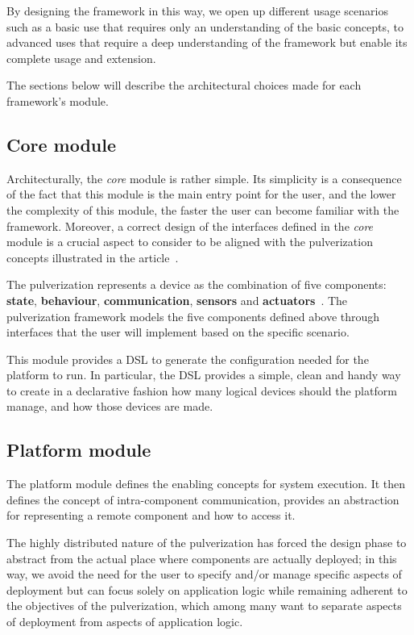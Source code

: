 By designing the framework in this way, we open up different usage scenarios such as a basic use that requires only an understanding of the
basic concepts, to advanced uses that require a deep understanding of the framework but enable its complete usage and extension.


The sections below will describe the architectural choices made for each framework's module.

\subsection{Core module}
\label{sec:core-module}

Architecturally, the \emph{core} module is rather simple. Its simplicity is a consequence of the fact that this module is the main entry point
for the user, and the lower the complexity of this module, the faster the user can become familiar with the framework.
Moreover, a correct design of the interfaces defined in the \emph{core} module is a crucial aspect to consider to be aligned with the
pulverization concepts illustrated in the article~\cite{fi12110203}.

The pulverization represents a device as the combination of five components: \textbf{state}, \textbf{behaviour}, \textbf{communication},
\textbf{sensors} and \textbf{actuators}~\cite{fi12110203}.
The pulverization framework models the five components defined above through interfaces that the user will implement based on the specific scenario.

This module provides a DSL to generate the configuration needed for the platform to run. In particular, the DSL provides a simple, clean and handy
way to create in a declarative fashion how many logical devices should the platform manage, and how those devices are made.

\subsection{Platform module}
\label{sec:platform-module}

The platform module defines the enabling concepts for system execution. It then defines the concept of intra-component communication,
provides an abstraction for representing a remote component and how to access it.

The highly distributed nature of the pulverization has forced the design phase to abstract from the actual place where components are actually
deployed; in this way, we avoid the need for the user to specify and/or manage specific aspects of deployment but can focus solely on
application logic while remaining adherent to the objectives of the pulverization, which among many want to separate aspects of 
deployment from aspects of application logic.

